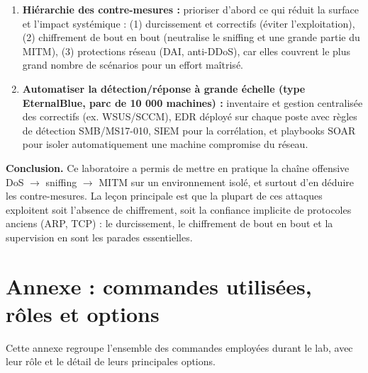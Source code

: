 \documentclass[11pt,a4paper]{article}
\begin{document}
\begin{enumerate}[leftmargin=1.6em]
  \item \textbf{Hiérarchie des contre-mesures :} prioriser d'abord ce qui réduit la surface
        et l'impact systémique : (1) durcissement et correctifs (éviter l'exploitation),
        (2) chiffrement de bout en bout (neutralise le sniffing et une grande partie du MITM),
        (3) protections réseau (DAI, anti-DDoS), car elles couvrent le plus grand nombre de
        scénarios pour un effort maîtrisé.

  \item \textbf{Automatiser la détection/réponse à grande échelle (type EternalBlue, parc de
        10 000 machines) :} inventaire et gestion centralisée des correctifs (ex. WSUS/SCCM),
        EDR déployé sur chaque poste avec règles de détection SMB/MS17-010, SIEM pour la
        corrélation, et playbooks SOAR pour isoler automatiquement une machine compromise du
        réseau.
\end{enumerate}

\medskip
\noindent\textbf{Conclusion.} Ce laboratoire a permis de mettre en pratique la chaîne
offensive DoS $\rightarrow$ sniffing $\rightarrow$ MITM sur un environnement isolé, et
surtout d'en déduire les contre-mesures. La leçon principale est que la plupart de ces
attaques exploitent soit l'absence de chiffrement, soit la confiance implicite de protocoles
anciens (ARP, TCP) : le durcissement, le chiffrement de bout en bout et la supervision en
sont les parades essentielles.

\section{Annexe : commandes utilisées, rôles et options}
Cette annexe regroupe l'ensemble des commandes employées durant le lab, avec leur rôle et le
détail de leurs principales options.
\end{document}

